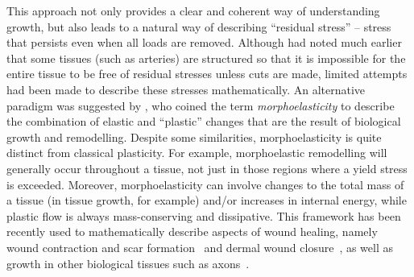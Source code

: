 This approach not only provides a clear and coherent way of understanding growth, but also leads to a natural way of describing ``residual stress'' -- stress that persists even when all loads are removed. Although \citet{FungBiomechMPLT} had noted much earlier that some tissues (such as arteries) are structured so that it is impossible for the entire tissue to be free of residual stresses unless cuts are made, limited attempts had been made to describe these stresses mathematically. An alternative paradigm was suggested by \citet{Goriely2007}, who coined the term \emph{morphoelasticity} to describe the combination of elastic and ``plastic'' changes that are the result of biological growth and remodelling. Despite some similarities, morphoelasticity is quite distinct from classical plasticity. For example, morphoelastic remodelling will generally occur throughout a tissue, not just in those regions where a yield stress is exceeded. Moreover, morphoelasticity can involve changes to the total mass of a tissue (in tissue growth, for example) and/or increases in internal energy, while plastic flow is always mass-conserving and dissipative. This framework has been recently used to mathematically describe aspects of wound healing, namely wound contraction and scar formation~\citep{Yang2013} and dermal wound closure~\citep{Bowden2016}, as well as growth in other biological tissues such as axons~\citep{Garcia2016}.

